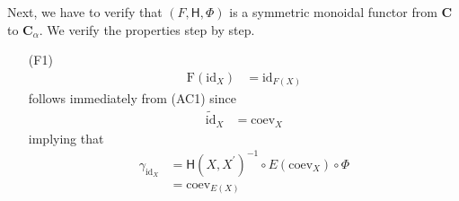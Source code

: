 \begin{prf}
Next, we have to verify that $(F,\mathsf{H},\Phi)$ is a symmetric monoidal functor from $\mathbf{C}$ to $\mathbf{C}_{\alpha}$. We verify the properties step by step.
\begin{enumerate}
\item[(F1)]
\begin{align*}
  \mathrm{F}(\mathrm{id}_{X})
  &=
  \mathrm{id}_{F(X)}
\end{align*}
follows immediately from (AC1) since
\begin{align*}
  \widetilde{\mathrm{id}}_{X}
  &=
  \mathrm{coev}_{X}
\end{align*}
implying that
\begin{align*}
  \gamma_{\mathrm{id}_{X}}
  &=
  \mathsf{H}(X,X^{\prime})^{-1}
  \circ
  E(\mathrm{coev}_{X})
  \circ
  \Phi
  \\
  &=
  \mathrm{coev}_{E(X)}
\end{align*}


\end{enumerate}
\end{prf}
